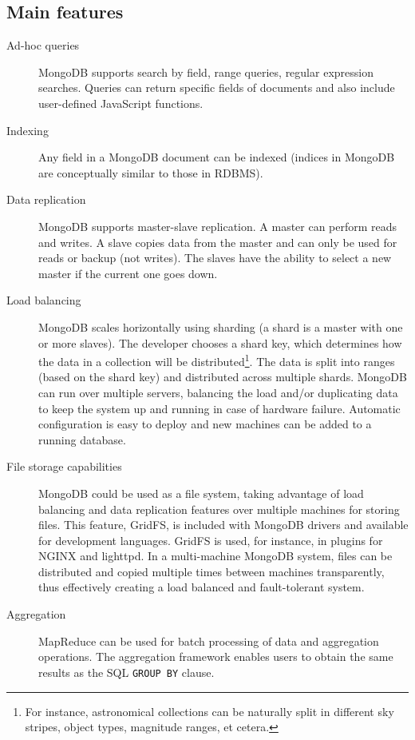 \subsection{Main features} %
\label{sub:main_features}

\begin{description} %

\item[Ad-hoc queries] %
MongoDB supports search by field, range queries, regular expression searches. Queries can return specific fields of documents and also include user-defined JavaScript functions.

\item[Indexing] %
Any field in a MongoDB document can be indexed (indices in MongoDB are conceptually similar to those in RDBMS).

\item[Data replication] %
MongoDB supports master-slave replication. A master can perform reads and writes. A slave copies data from the master and can only be used for reads or backup (not writes). The slaves have the ability to select a new master if the current one goes down.

\item[Load balancing] %
MongoDB scales horizontally using sharding (a shard is a master with one or more slaves). The developer chooses a shard key, which determines how the data in a collection will be
distributed\footnote{For instance, astronomical collections can be naturally split in different sky stripes, object types, magnitude ranges, et cetera.}. %
The data is split into ranges (based on the shard key) and distributed across multiple shards. MongoDB can run over multiple servers, balancing the load and/or duplicating data to keep the system up and running in case of hardware failure. Automatic configuration is easy to deploy and new machines can be added to a running database.

\item[File storage capabilities] %

MongoDB could be used as a file system, taking advantage of load balancing and data replication features over multiple machines for storing files. This feature, GridFS, is included with MongoDB drivers and available for development languages. GridFS is used, for instance, in plugins for NGINX and lighttpd. In a multi-machine MongoDB system, files can be distributed and copied multiple times between machines transparently, thus effectively creating a load balanced and
fault-tolerant %
system.

\item[Aggregation] %
MapReduce can be used for batch processing of data and aggregation operations. The aggregation framework enables users to obtain the same results as the SQL
\texttt{GROUP BY}
clause.

\end{description} %

